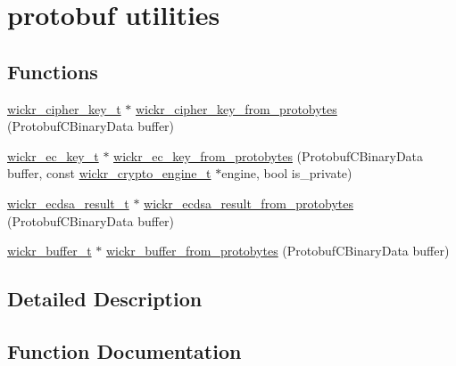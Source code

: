 \hypertarget{group__protobuf__utils}{}\section{protobuf utilities}
\label{group__protobuf__utils}
\subsection*{Functions}
\begin{DoxyCompactItemize}
\item 
\hyperlink{structwickr__cipher__key}{wickr\+\_\+cipher\+\_\+key\+\_\+t} $\ast$ \hyperlink{group__protobuf__utils_ga29c41b9d38441ba0fc54c7ffc0ea91a4}{wickr\+\_\+cipher\+\_\+key\+\_\+from\+\_\+protobytes} (Protobuf\+C\+Binary\+Data buffer)
\item 
\hyperlink{structwickr__ec__key}{wickr\+\_\+ec\+\_\+key\+\_\+t} $\ast$ \hyperlink{group__protobuf__utils_gac18223ab7af7d533ac09084f3c2caa4b}{wickr\+\_\+ec\+\_\+key\+\_\+from\+\_\+protobytes} (Protobuf\+C\+Binary\+Data buffer, const \hyperlink{structwickr__crypto__engine}{wickr\+\_\+crypto\+\_\+engine\+\_\+t} $\ast$engine, bool is\+\_\+private)
\item 
\hyperlink{structwickr__ecdsa__result}{wickr\+\_\+ecdsa\+\_\+result\+\_\+t} $\ast$ \hyperlink{group__protobuf__utils_ga3b5c6c2941820a16a527fccebb0b8821}{wickr\+\_\+ecdsa\+\_\+result\+\_\+from\+\_\+protobytes} (Protobuf\+C\+Binary\+Data buffer)
\item 
\hyperlink{structwickr__buffer}{wickr\+\_\+buffer\+\_\+t} $\ast$ \hyperlink{group__protobuf__utils_ga82aef3139be67d3646dc1e76c31a3352}{wickr\+\_\+buffer\+\_\+from\+\_\+protobytes} (Protobuf\+C\+Binary\+Data buffer)
\end{DoxyCompactItemize}


\subsection{Detailed Description}


\subsection{Function Documentation}
\mbox{\label{group__protobuf__utils_ga82aef3139be67d3646dc1e76c31a3352}} 
